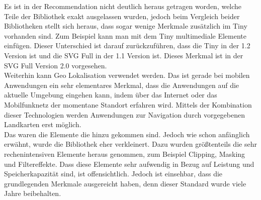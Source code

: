 Es ist in der Recommendation nicht deutlich heraus getragen worden, welche Teile der Bibliothek exakt ausgelassen wurden, jedoch beim Vergleich beider Bibliotheken stellt sich heraus, dass sogar wenige Merkmale zusätzlich im Tiny vorhanden sind. Zum Beispiel kann man mit dem Tiny multimediale Elemente einfügen. Dieser Unterschied ist darauf zurückzuführen, dass die Tiny in der 1.2 Version ist und die SVG Full in der 1.1 Version ist. Dieses Merkmal ist in der SVG Full Version 2.0 vorgesehen.\\
Weiterhin kann Geo Lokalisation verwendet werden. Das ist gerade bei mobilen Anwendungen ein sehr elementares Merkmal, dass die Anwendungen auf die aktuelle Umgebung eingehen kann, indem über das Internet oder das Mobilfunknetz der momentane Standort erfahren wird. Mittels der Kombination dieser Technologien werden Anwendungen zur Navigation durch vorgegebenen Landkarten erst möglich.\\
Das waren die Elemente die hinzu gekommen sind. Jedoch wie schon anfänglich erwähnt, wurde die Bibliothek eher verkleinert. Dazu wurden größtenteils die sehr rechenintensiven Elemente heraus genommen, zum Beispiel Clipping, Masking und Filtereffekte. Dass diese Elemente sehr aufwendig in Bezug auf Leistung und Speicherkapazität sind, ist offensichtlich. Jedoch ist einsehbar, dass die grundlegenden Merkmale ausgereicht haben, denn dieser Standard wurde viele Jahre beibehalten.

